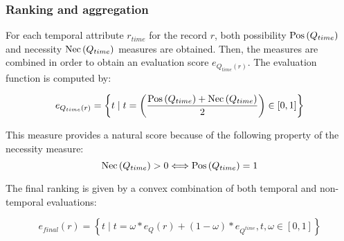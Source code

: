 \begin{table}[h]
\begin{tabular}{|c|c|c|}
\end{tabular}
%
%
%
\label{tab:fuzzy-allen-relations}
\end{table}

\subsubsection{Ranking and aggregation}
For each temporal attribute $r_{time}$ for the record $r$, both possibility $\operatorname{Pos} \left( Q_{time}\right)$ and necessity $\operatorname{Nec} \left( Q_{time} \right)$ measures are obtained. Then, the measures are combined in order to obtain an evaluation score $e_{Q_{time} \left( r \right)}$. The evaluation function is computed by:

\begin{equation}
\label{eq:temporal-eval}
e_{Q_{time} \left( r \right)} = \left \lbrace t \mid t = \left( \frac{\Pos \left( Q_{time}\right) + \Nec \left( Q_{time} \right)}{2} \right)   \in \left[ 0,1\right] \right \rbrace
\end{equation}

This measure provides a natural score because of the following property of the necessity measure: 
\begin{equation}
\label{eq:necessity} %
\Nec \left( Q_{time} \right) > 0  \Longleftrightarrow  \Pos \left( Q_{time}\right) = 1
\end{equation}

The final ranking is given by a convex combination of both temporal and non-temporal evaluations:

\begin{equation}
\label{eq:convex-combination}
e_{final} \left( r \right) = \left \lbrace t \mid t = \omega \ast e_{Q} \left( r \right) + \left( 1- \omega \right) \ast e_{Q^{time}}, t,\omega \in \left[0,1\right] \right \rbrace
\end{equation}




